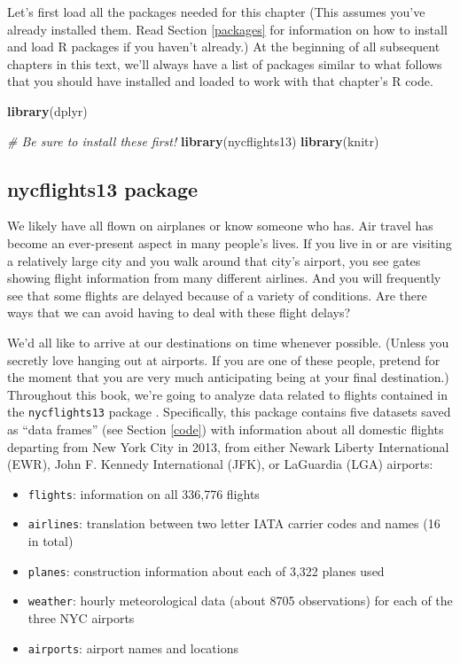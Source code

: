 \documentclass[12pt,]{krantz}
\makeatletter
\newenvironment{Shaded}{\begin{snugshade}}{\end{snugshade}}
\newcommand{\KeywordTok}[1]{\textcolor[rgb]{0.27,0.27,0.27}{\textbf{#1}}}
\newcommand{\CommentTok}[1]{\textcolor[rgb]{0.37,0.37,0.37}{\textit{#1}}}
\newcommand{\NormalTok}[1]{#1}
\providecommand{\tightlist}{%
  \setlength{\itemsep}{0pt}\setlength{\parskip}{0pt}}
\newenvironment{kframe}{%
\medskip{}
\setlength{\fboxsep}{.8em}
 \def\at@end@of@kframe{}%
 \ifinner\ifhmode%
  \def\at@end@of@kframe{\end{minipage}}%
  \begin{minipage}{\columnwidth}%
 \fi\fi%
 \def\FrameCommand##1{\hskip\@totalleftmargin \hskip-\fboxsep
 \colorbox{shadecolor}{##1}\hskip-\fboxsep
     \hskip-\linewidth \hskip-\@totalleftmargin \hskip\columnwidth}%
 \MakeFramed {\advance\hsize-\width
   \@totalleftmargin\z@ \linewidth\hsize
   \@setminipage}}%
 {\par\unskip\endMakeFramed%
 \at@end@of@kframe}
\renewenvironment{Shaded}{\begin{kframe}}{\end{kframe}}
\makeatother
\begin{document}
Let's first load all the packages needed for this chapter (This assumes
you've already installed them. Read Section \ref{packages} for
information on how to install and load R packages if you haven't
already.) At the beginning of all subsequent chapters in this text,
we'll always have a list of packages similar to what follows that you
should have installed and loaded to work with that chapter's R code.

\begin{Shaded}
\begin{Highlighting}[]
\KeywordTok{library}\NormalTok{(dplyr)}

\CommentTok{# Be sure to install these first!}
\KeywordTok{library}\NormalTok{(nycflights13)}
\KeywordTok{library}\NormalTok{(knitr)}
\end{Highlighting}
\end{Shaded}

\subsection{nycflights13 package}\label{nycflights13-package}

We likely have all flown on airplanes or know someone who has. Air
travel has become an ever-present aspect in many people's lives. If you
live in or are visiting a relatively large city and you walk around that
city's airport, you see gates showing flight information from many
different airlines. And you will frequently see that some flights are
delayed because of a variety of conditions. Are there ways that we can
avoid having to deal with these flight delays?

We'd all like to arrive at our destinations on time whenever possible.
(Unless you secretly love hanging out at airports. If you are one of
these people, pretend for the moment that you are very much anticipating
being at your final destination.) Throughout this book, we're going to
analyze data related to flights contained in the \texttt{nycflights13}
package \citep{R-nycflights13}. Specifically, this package contains five
datasets saved as ``data frames'' (see Section \ref{code}) with
information about all domestic flights departing from New York City in
2013, from either Newark Liberty International (EWR), John F. Kennedy
International (JFK), or LaGuardia (LGA) airports:

\begin{itemize}
\tightlist
\item
  \texttt{flights}: information on all 336,776 flights
\item
  \texttt{airlines}: translation between two letter IATA carrier codes
  and names (16 in total)
\item
  \texttt{planes}: construction information about each of 3,322 planes
  used
\item
  \texttt{weather}: hourly meteorological data (about 8705 observations)
  for each of the three NYC airports
\item
  \texttt{airports}: airport names and locations
\end{itemize}
\end{document}
